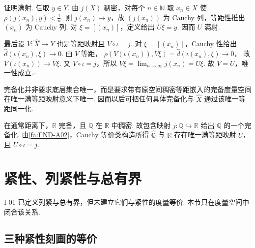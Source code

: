 \begin{FAProof}
证明满射. 任取 \(\displaystyle y\in Y\). 由 \(\displaystyle j(X)\) 稠密，对每个 \(\displaystyle n\in\mathbb N\) 取 \(\displaystyle x_n\in X\) 使 \(\displaystyle \rho(j(x_n),y)<\frac{1}{n}\). 则 \(\displaystyle j(x_n)\to y\)，故 \(\displaystyle (j(x_n))\) 为 Cauchy 列，等距性推出 \(\displaystyle (x_n)\) 为 Cauchy 列. 对 \(\displaystyle \xi=[(x_n)]\)，定义给出 \(\displaystyle U\xi=y\). 因而 \(\displaystyle U\) 满射.

最后设 \(\displaystyle V:\widehat X\to Y\) 也是等距映射且 \(\displaystyle V\circ\iota=j\). 对 \(\displaystyle \xi=[(x_n)]\)，Cauchy 性给出 \(\displaystyle \widehat d(\iota(x_n),\xi)\to0\). 由 \(\displaystyle V\) 等距，
\(\displaystyle \rho(V(\iota(x_n)),V\xi)=\widehat d(\iota(x_n),\xi)\to0\)，
故 \(\displaystyle V(\iota(x_n))\to V\xi\). 又 \(\displaystyle V\circ\iota=j\)，所以
\(\displaystyle V\xi=\lim_{n\to\infty}j(x_n)=U\xi\).
故 \(\displaystyle V=U\)，唯一性成立.\hfill\(\square\)
\end{FAProof}

\begin{FARemark}[唯一性语义]
完备化并非要求底层集合唯一，而是要求带有原空间稠密等距嵌入的完备度量空间在唯一满等距映射意义下唯一. 因而以后可把任何具体完备化与 \(\displaystyle \widehat X\) 通过该唯一等距同一化.
\end{FARemark}

\begin{FAExample}
在通常距离下，\(\displaystyle \mathbb R\) 完备，且 \(\displaystyle \mathbb Q\) 在 \(\displaystyle \mathbb R\) 中稠密. 故包含映射 \(\displaystyle j:\mathbb Q\hookrightarrow\mathbb R\) 给出 \(\displaystyle \mathbb Q\) 的一个完备化. 由\autoref{fa:FND-A02}，Cauchy 等价类构造所得 \(\displaystyle \widehat{\mathbb Q}\) 与 \(\displaystyle \mathbb R\) 存在唯一满等距映射 \(\displaystyle U\)，且 \(\displaystyle U\circ\iota=j\).
\end{FAExample}

\section{紧性、列紧性与总有界}\label{sec:i02-compactness}

I-01 已定义列紧与总有界，但未建立它们与紧性的度量等价. 本节只在度量空间中闭合该关系.

\subsection{三种紧性刻画的等价}

